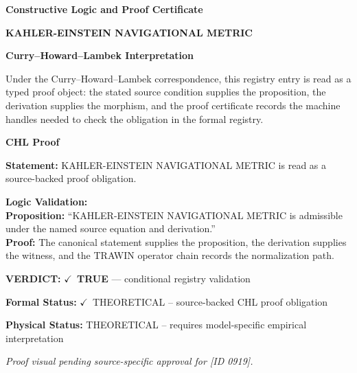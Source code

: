 \clearpage
\begingroup\tzpsupportsetup
\noindent\textbf{\fontsize{10.8pt}{12.8pt}\selectfont [ID 0919] Constructive Logic and Proof Certificate}\par
\noindent\textbf{\fontsize{10pt}{12pt}\selectfont KAHLER-EINSTEIN NAVIGATIONAL METRIC}\par
\vspace{0.45em}
\begingroup
\footnotesize
\setlength{\parskip}{0.22em}
\setlength{\parindent}{0pt}
\noindent\textbf{Curry--Howard--Lambek Interpretation}\par
Under the Curry--Howard--Lambek correspondence, this registry entry is read as a typed proof
object: the stated source condition supplies the proposition, the derivation supplies the
morphism, and the proof certificate records the machine handles needed to check the obligation
in the formal registry.

\vspace{0.45em}
\noindent\textbf{CHL Proof}\par
\textbf{Statement:} KAHLER-EINSTEIN NAVIGATIONAL METRIC is read as a source-backed proof obligation.

\textbf{Logic Validation:}\\
\textbf{Proposition:} ``KAHLER-EINSTEIN NAVIGATIONAL METRIC is admissible under the named source equation and derivation.''\\
\textbf{Proof:} The canonical statement supplies the proposition, the derivation supplies the witness, and the TRAWIN operator chain records the normalization path.

\textbf{VERDICT:} \ensuremath{\checkmark}\ \textbf{TRUE} --- conditional registry validation

\textbf{Formal Status:} \ensuremath{\checkmark}\ THEORETICAL -- source-backed CHL proof obligation

\textbf{Physical Status:} THEORETICAL -- requires model-specific empirical interpretation
\par\vspace{0.45em}
\par
\vfill
\begingroup\footnotesize\itshape
Proof visual pending source-specific approval for [ID 0919].
\par\endgroup
\vfill
\endgroup
\endgroup
